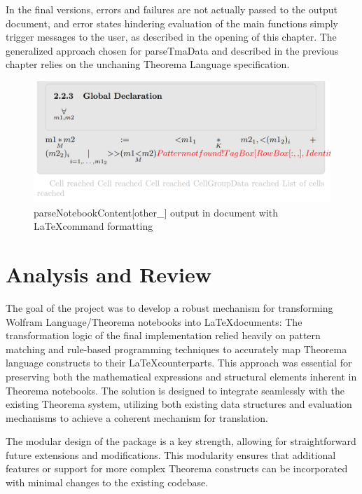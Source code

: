 In the final versions, errors and failures are not actually passed to the output document, and error states hindering evaluation of the main functions simply trigger messages to the user, as described in the opening of this chapter. The generalized approach chosen for parseTmaData and described in the previous chapter relies on the unchaning Theorema Language specification.

\begin{figure}[h]
    \centering
    \includegraphics[scale=0.5]{images/closing/Screenshot 2024-03-08 171539.png}
    \caption{parseNotebookContent[other\_] output in document with \LaTeX command formatting}
    \label{fig:parseNotebookContent[other_]-output}
\end{figure}
 
 
\section{Analysis and Review}

The goal of the project was to develop a robust mechanism for transforming Wolfram Language/Theorema notebooks into \LaTeX documents: The transformation logic of the final implementation relied heavily on pattern matching and rule-based programming techniques to accurately map Theorema language constructs to their \LaTeX counterparts. This approach was essential for preserving both the mathematical expressions and structural elements inherent in Theorema notebooks. The solution is designed to integrate seamlessly with the existing Theorema system, utilizing both existing data structures and evaluation mechanisms to achieve a coherent mechanism for translation.

The modular design of the package is a key strength, allowing for straightforward future extensions and modifications. This modularity ensures that additional features or support for more complex Theorema constructs can be incorporated with minimal changes to the existing codebase. 

